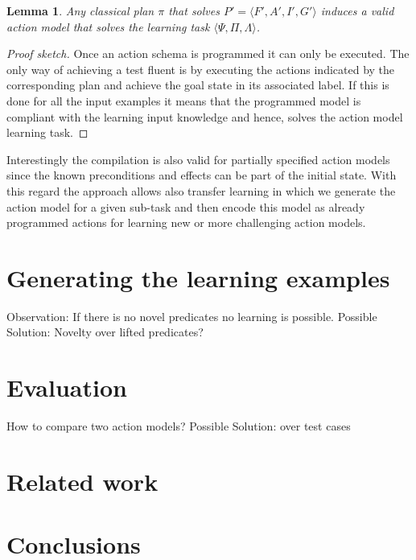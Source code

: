 \documentclass[letterpaper]{article} %
\newcommand{\tup}[1]{{\langle #1 \rangle}}
\newtheorem{lemma}[theorem]{Lemma}
\begin{document}
\begin{lemma}
Any classical plan $\pi$ that solves $P'=\tup{F',A',I',G'}$ induces a valid action model that solves the learning task $\tup{\Psi,\Pi,\Lambda}$.
\end{lemma}

\begin{proof}[Proof sketch]
Once an action schema is programmed it can only be executed. The only way of achieving a test fluent is by executing the actions indicated by the corresponding plan and achieve the goal state in its associated label. If this is done for all the input examples it means that the programmed model is compliant with the learning input knowledge and hence, solves the action model learning task.
\end{proof}

Interestingly the compilation is also valid for partially specified action models since the known preconditions and effects can be part of the initial state. With this regard the approach allows also transfer learning in which we generate the action model for a given sub-task and then encode this model as already programmed actions for learning new or more challenging action models.


\section{Generating the learning examples}
Observation: If there is no novel predicates no learning is possible. Possible Solution: Novelty over lifted predicates? 


\section{Evaluation}
How to compare two action models? Possible Solution: over test cases

\section{Related work}

\section{Conclusions}
\end{document}
